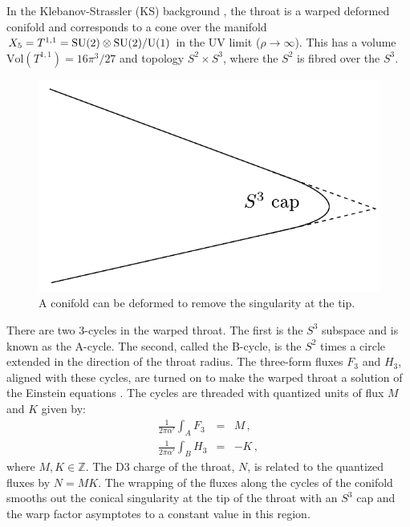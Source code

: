 
In the Klebanov-Strassler (KS) background \cite{ks}, the throat 
is a warped deformed conifold and 
corresponds to a cone over the manifold 
$X_5 = T^{1,1}= {\rm SU(2)} \otimes {\rm SU(2)}/{\rm U(1)}$
in the UV limit ($\rho \rightarrow \infty$). This has   
a volume $\mathrm{Vol} (T^{1,1}) = 16\pi^3/27$ and  topology
$S^2\times S^3$, where the $S^2$ is fibred over the $S^3$.

\begin{figure}
\centering
\includegraphics{dbi/graphs/deformed-conifold}   
\caption[Deformed Conifold]{A conifold can be deformed to remove the singularity at
the tip.}
\label{fig:conifold-dbiintro}
\end{figure}

There are two 3-cycles in the warped throat. The first is the $S^3$ subspace and
is known as the A-cycle. The second, called the B-cycle, is the $S^2$ times a
circle extended in the direction of the throat radius. The three-form fluxes
$F_3$ and $H_3$, aligned with these cycles, are turned on to make the warped
throat a solution of the Einstein equations \cite{cline}. The cycles are threaded with
quantized units of flux $M$ and $K$ given by: 
\begin{eqnarray}
\label{eq:fluxdefn-dbiintro}
 \frac{1}{2\pi\alpha'}\int_A F_3 &=& M \,, \\
 \frac{1}{2\pi\alpha'}\int_B H_3 &=& -K\,, 
\end{eqnarray}
where $M,K\in \mathbb{Z}$.
The D$3$ charge of the throat, $N$, is related to the quantized fluxes by
$N=MK$.
The wrapping of the fluxes along the cycles of the conifold smooths out the
conical singularity at the tip of the throat with an $S^3$ cap 
\cite{ks,kt} and the warp factor asymptotes to 
a constant value in this region.


